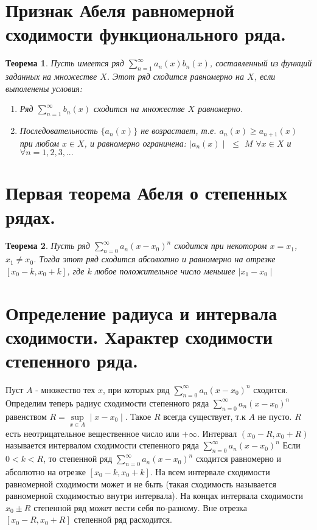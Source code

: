 \documentclass[12pt, a4paper]{article}
\newtheorem{thm}{Теорема}
\begin{document}
\section{Признак Абеля равномерной сходимости функционального ряда.}
\begin{thm}
	Пусть имеется ряд $\sum\limits_{n=1}^{\infty}a_n(x)b_n(x)$, составленный из  функций заданных на множестве $X$. Этот ряд сходится равномерно на $X$, если выполенены условия:
	\begin{enumerate}
		\item{Ряд $\sum\limits_{n=1}^{\infty}b_n(x)$ сходится на множестве $X$ равномерно.}
		\item{Последовательность $\{a_n(x)\}$ не возрастает, т.е. $a_n(x) \geq a_{n + 1}(x)$ при любом $x \in X$, и равномерно ограничена: $\mid a_n(x) \mid$ $\leq$ $M$ $\forall x \in X$ и $\forall n=1,2,3,...$  } 
	\end{enumerate}

\end{thm}


\section{Первая теорема Абеля о степенных рядах.}
\begin{thm}
	Пусть ряд $\sum\limits_{n=0}^{\infty}a_n(x-x_0)^n$ сходится при некотором $x = x_1$, $x_1 \neq x_0$. Тогда этот ряд сходится абсолютно и равномерно на отрезке $[x_0 - k, x_0 + k]$, где $k$ любое положительное число меньшее $\mid x_1 - x_0 \mid$
\end{thm}


\section{Определение радиуса и интервала сходимости. Характер сходимости степенного ряда.}
Пуст $A$ - множество тех $x$, при которых ряд $\sum\limits_{n=0}^{\infty}a_n(x-x_0)^n$ сходится.
\newline
Определим теперь радиус сходимости степенного ряда $\sum\limits_{n=0}^{\infty}a_n(x-x_0)^n$ равенством $R = \sup\limits_{x \in A}\mid x - x_0 \mid$. Такое $R$ всегда существует, т.к $A$ не пусто. $R$ есть неотрицательное вещественное число или $+\infty$.
\newline
Интервал $(x_0 - R, x_0 + R)$ называется интервалом сходимости степенного ряда $\sum\limits_{n=0}^{\infty}a_n(x-x_0)^n$ 
\newline
Если $0 < k < R$, то степенной ряд $\sum\limits_{n=0}^{\infty}a_n(x-x_0)^n$ сходится равномерно и абсолютно на отрезке $[x_0 - k, x_0 + k]$. На всем интервале сходимости равномерной сходимости может и не быть (такая сходимость называется равномерной сходимостью внутри интервала). На концах интервала сходимости $x_0 \pm R$ степенной ряд может вести себя по-разному. Вне отрезка $[x_0 - R, x_0 + R]$ степенной ряд расходится.
\end{document}
